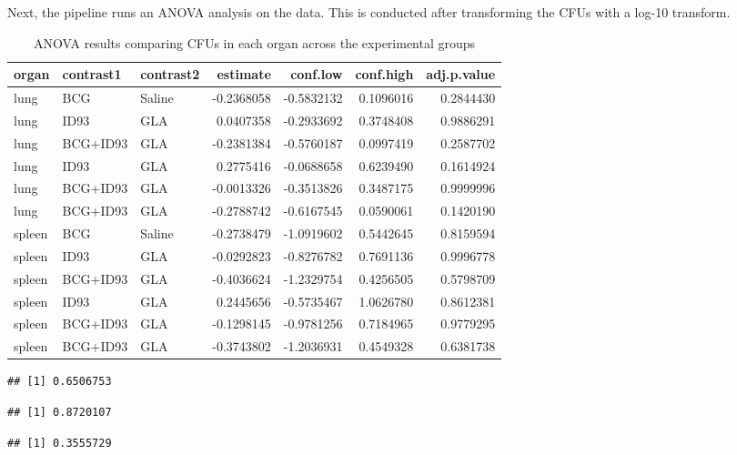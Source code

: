 \documentclass[
]{book}
\begin{document}
Next, the pipeline runs an ANOVA analysis on the data. This is conducted after
transforming the CFUs with a log-10 transform.

\begin{table}

\caption{\label{tab:unnamed-chunk-34}ANOVA results comparing CFUs in each organ across the experimental groups}
\centering
\begin{tabular}[t]{l|l|l|r|r|r|r}
\hline
organ & contrast1 & contrast2 & estimate & conf.low & conf.high & adj.p.value\\
\hline
lung & BCG & Saline & -0.2368058 & -0.5832132 & 0.1096016 & 0.2844430\\
\hline
lung & ID93 & GLA & 0.0407358 & -0.2933692 & 0.3748408 & 0.9886291\\
\hline
lung & BCG+ID93 & GLA & -0.2381384 & -0.5760187 & 0.0997419 & 0.2587702\\
\hline
lung & ID93 & GLA & 0.2775416 & -0.0688658 & 0.6239490 & 0.1614924\\
\hline
lung & BCG+ID93 & GLA & -0.0013326 & -0.3513826 & 0.3487175 & 0.9999996\\
\hline
lung & BCG+ID93 & GLA & -0.2788742 & -0.6167545 & 0.0590061 & 0.1420190\\
\hline
spleen & BCG & Saline & -0.2738479 & -1.0919602 & 0.5442645 & 0.8159594\\
\hline
spleen & ID93 & GLA & -0.0292823 & -0.8276782 & 0.7691136 & 0.9996778\\
\hline
spleen & BCG+ID93 & GLA & -0.4036624 & -1.2329754 & 0.4256505 & 0.5798709\\
\hline
spleen & ID93 & GLA & 0.2445656 & -0.5735467 & 1.0626780 & 0.8612381\\
\hline
spleen & BCG+ID93 & GLA & -0.1298145 & -0.9781256 & 0.7184965 & 0.9779295\\
\hline
spleen & BCG+ID93 & GLA & -0.3743802 & -1.2036931 & 0.4549328 & 0.6381738\\
\hline
\end{tabular}
\end{table}

\begin{verbatim}
## [1] 0.6506753
\end{verbatim}

\begin{verbatim}
## [1] 0.8720107
\end{verbatim}

\begin{verbatim}
## [1] 0.3555729
\end{verbatim}
\end{document}
